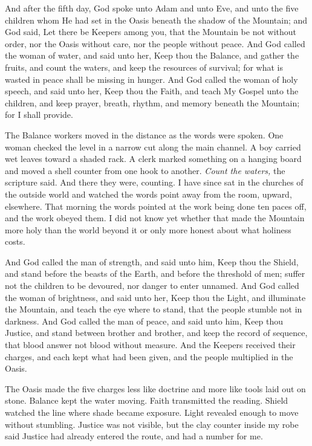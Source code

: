 \begin{scripture}
And after the fifth day, God spoke unto Adam and unto Eve, and unto the five children whom He had set in the Oasis beneath the shadow of the Mountain; and God said, Let there be Keepers among you, that the Mountain be not without order, nor the Oasis without care, nor the people without peace.
And God called the woman of water, and said unto her, Keep thou the Balance, and gather the fruits, and count the waters, and keep the resources of survival; for what is wasted in peace shall be missing in hunger.
And God called the woman of holy speech, and said unto her, Keep thou the Faith, and teach My Gospel unto the children, and keep prayer, breath, rhythm, and memory beneath the Mountain; for I shall provide.
\end{scripture}
The Balance workers moved in the distance as the words were spoken. One woman checked the level in a narrow cut along the main channel. A boy carried wet leaves toward a shaded rack. A clerk marked something on a hanging board and moved a shell counter from one hook to another. \textit{Count the waters,} the scripture said. And there they were, counting. I have since sat in the churches of the outside world and watched the words point away from the room, upward, elsewhere. That morning the words pointed at the work being done ten paces off, and the work obeyed them. I did not know yet whether that made the Mountain more holy than the world beyond it or only more honest about what holiness costs.\par

\begin{scripture}
And God called the man of strength, and said unto him, Keep thou the Shield, and stand before the beasts of the Earth, and before the threshold of men; suffer not the children to be devoured, nor danger to enter unnamed.
And God called the woman of brightness, and said unto her, Keep thou the Light, and illuminate the Mountain, and teach the eye where to stand, that the people stumble not in darkness.
And God called the man of peace, and said unto him, Keep thou Justice, and stand between brother and brother, and keep the record of sequence, that blood answer not blood without measure.
And the Keepers received their charges, and each kept what had been given, and the people multiplied in the Oasis.
\end{scripture}
The Oasis made the five charges less like doctrine and more like tools laid out on stone. Balance kept the water moving. Faith transmitted the reading. Shield watched the line where shade became exposure. Light revealed enough to move without stumbling. Justice was not visible, but the clay counter inside my robe said Justice had already entered the route, and had a number for me.\par

